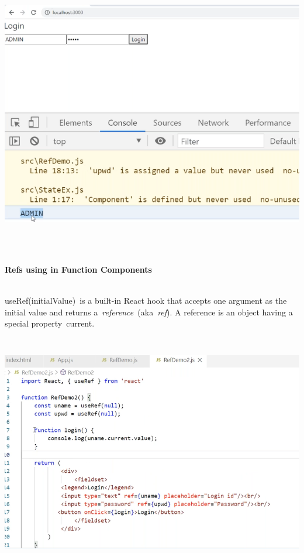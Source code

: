 \documentclass{article}
\begin{document}
\begin{center}
	\noindent \includegraphics*[width=6.19in, height=4.56in]{IMG-10-15}
\end{center}

\noindent 


\newpage
\noindent \\
\textbf{Refs using in Function Components}

\noindent 

\noindent \\
useRef(initialValue)~is a built-in React hook that accepts one argument as the initial value and returns a~\textit{reference}~(aka~\textit{ref}). A reference is an object having a special property~current.

\noindent 

\noindent 

\begin{center}
	\noindent \includegraphics*[width=6.20in, height=4.06in]{IMG-10-16}
\end{center}
\end{document}

